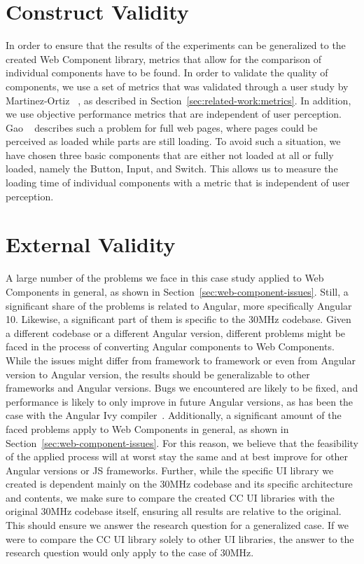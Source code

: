 \section{Construct Validity}
In order to ensure that the results of the experiments can be generalized to the created Web Component library, metrics that allow for the comparison of individual components have to be found. In order to validate the quality of components, we use a set of metrics that was validated through a user study by Martinez-Ortiz \etal{}~\cite{martinez-ortiz2016quality}, as described in Section~\ref{sec:related-work:metrics}. In addition, we use objective performance metrics that are independent of user perception. Gao \etal{}~\cite{gao2017perceived} describes such a problem for full web pages, where pages could be perceived as loaded while parts are still loading. To avoid such a situation, we have chosen three basic components that are either not loaded at all or fully loaded, namely the Button, Input, and Switch. This allows us to measure the loading time of individual components with a metric that is independent of user perception.

\section{External Validity}
A large number of the problems we face in this case study applied to Web Components in general, as shown in Section~\ref{sec:web-component-issues}. Still, a significant share of the problems is related to Angular, more specifically Angular 10. Likewise, a significant part of them is specific to the 30MHz codebase. Given a different codebase or a different Angular version, different problems might be faced in the process of converting Angular components to Web Components. While the issues might differ from framework to framework or even from Angular version to Angular version, the results should be generalizable to other frameworks and Angular versions. Bugs we encountered are likely to be fixed, and performance is likely to only improve in future Angular versions, as has been the case with the Angular Ivy compiler~. Additionally, a significant amount of the faced problems apply to Web Components in general, as shown in Section~\ref{sec:web-component-issues}. For this reason, we believe that the feasibility of the applied process will at worst stay the same and at best improve for other Angular versions or JS frameworks.
Further, while the specific UI library we created is dependent mainly on the 30MHz codebase and its specific architecture and contents, we make sure to compare the created CC UI libraries with the original 30MHz codebase itself, ensuring all results are relative to the original. This should ensure we answer the research question for a generalized case. If we were to compare the CC UI library solely to other UI libraries, the answer to the research question would only apply to the case of 30MHz.